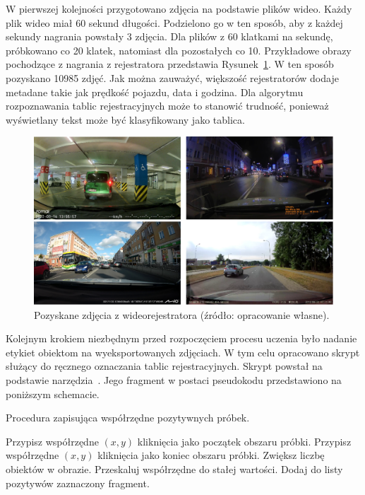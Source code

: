 W pierwszej kolejności przygotowano zdjęcia na podstawie plików wideo.
Każdy plik wideo miał 60 sekund długości.
Podzielono go w ten sposób, aby z każdej sekundy nagrania powstały 3 zdjęcia.
Dla plików z 60 klatkami na sekundę, próbkowano co 20 klatek, natomiast dla pozostałych co 10.
Przykładowe obrazy pochodzące z nagrania z rejestratora przedstawia Rysunek~\ref{fig:captured_frame}.
W ten sposób pozyskano 10985 zdjęć.
Jak można zauważyć, większość rejestratorów dodaje metadane takie jak prędkość pojazdu, data i godzina.
Dla algorytmu rozpoznawania tablic rejestracyjnych może to stanowić trudność, ponieważ wyświetlany tekst może być klasyfikowany jako tablica.
\begin{figure}[!ht]
    \centering
    \includegraphics[scale=0.4]{Pictures/captured_frames}
    \caption{Pozyskane zdjęcia z wideorejestratora (źródło: opracowanie własne).}
    \label{fig:captured_frame}
\end{figure}
\FloatBarrier

Kolejnym krokiem niezbędnym przed rozpoczęciem procesu uczenia było nadanie etykiet obiektom na wyeksportowanych zdjęciach.
W tym celu opracowano skrypt służący do ręcznego oznaczania tablic rejestracyjnych.
Skrypt powstał na podstawie narzędzia~\cite{haar_object_marker}.
Jego fragment w postaci pseudokodu przedstawiono na poniższym schemacie.
\begin{algorithm}
    \caption{Procedura zapisująca współrzędne pozytywnych próbek.}
    \begin{algorithmic}[1]
        \label{create_positives}
                    \State Przypisz współrzędne $(x,y)$ kliknięcia jako początek obszaru próbki.
                \Else
                    \State Przypisz współrzędne $(x,y)$ kliknięcia jako koniec obszaru próbki.
                    \State Zwiększ liczbę obiektów w obrazie.
                    \State Przeskaluj współrzędne do stałej wartości.
                    \State Dodaj do listy pozytywów zaznaczony fragment.
                \EndIf
            \EndIf
        \EndProcedure
    \end{algorithmic}
\end{algorithm}
\FloatBarrier


